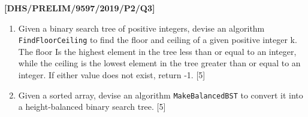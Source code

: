 \item \textbf{{[}DHS/PRELIM/9597/2019/P2/Q3{]} }
\begin{enumerate}
\item Given a binary search tree of positive integers, devise an algorithm
\texttt{FindFloorCeiling} to find the floor and ceiling of a given
positive integer k. The floor Is the highest element in the tree less
than or equal to an integer, while the ceiling is the lowest element
in the tree greater than or equal to an integer. If either value does
not exist, return -1. \hfill{}{[}5{]}
\item Given a sorted array, devise an algorithm \texttt{MakeBalancedBST}
to convert it into a height-balanced binary search tree. \hfill{}{[}5{]}
\end{enumerate}